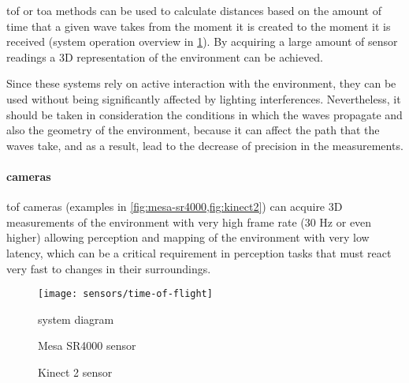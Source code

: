 \gls{tof} or \gls{toa} methods can be used to calculate distances based on the amount of time that a given wave takes from the moment it is created to the moment it is received (system operation overview in \cref{fig:time-of-flight}). By acquiring a large amount of sensor readings a 3D representation of the environment can be achieved.

Since these systems rely on active interaction with the environment, they can be used without being significantly affected by lighting interferences. Nevertheless, it should be taken in consideration the conditions in which the waves propagate and also the geometry of the environment, because it can affect the path that the waves take, and as a result, lead to the decrease of precision in the measurements.


\paragraph{ cameras}

\gls{tof} cameras (examples in \cref{fig:mesa-sr4000,fig:kinect2}) can acquire 3D measurements of the environment with very high frame rate (30 Hz or even higher) allowing perception and mapping of the environment with very low latency, which can be a critical requirement in perception tasks that must react very fast to changes in their surroundings.

\begin{figure}[H]
	\centering
	\texttt{[image: sensors/time-of-flight]}
	\caption[ system diagram]{ system diagram\protect\footnotemark}
	\label{fig:time-of-flight}
\end{figure}

\begin{figure}[H]
	\begin{floatrow}[2]
		{\caption[Mesa SR4000 sensor]{Mesa SR4000 sensor\protect\footnotemark}\label{fig:mesa-sr4000}}
		{\caption[Kinect 2 sensor]{Kinect 2 sensor\protect\footnotemark}\label{fig:kinect2}}
	\end{floatrow}
\end{figure}


